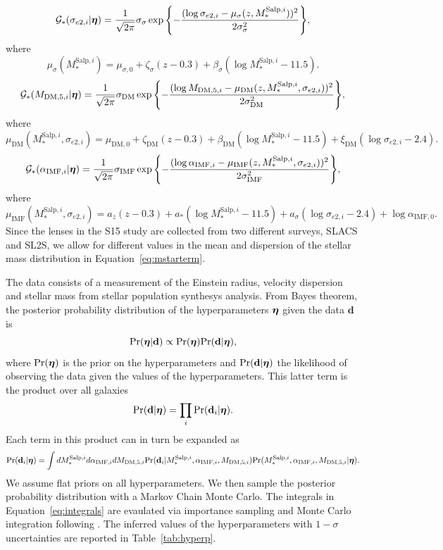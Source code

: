 \documentclass[usenatbib, letters]{mnras}
\newcommand{\boldsymbol}[1]{\mbox{\boldmath{${#1}$}}}
\def\pr{{\rm Pr}}
\def\hyperp{\boldsymbol{\eta}}
\def\msalpi{M_*^{\mathrm{Salp},i}}
\def\aimfi{\alpha_{\mathrm{IMF},i}}
\def\mdmi{M_{\mathrm{DM},5,i}}
\def\sigmaeei{\sigma_{e2,i}}
\def\datad{\mathbf{d}}
\def\datadi{\mathbf{d}_i}
\def\Tref#1{Table~\ref{#1}\xspace}
\def\Eref#1{Equation~\ref{#1}\xspace}
\begin{document}
\begin{equation}
\mathcal{G}_*(\sigmaeei|\hyperp) = \frac{1}{\sqrt{2\pi}}{\sigma_\sigma}\exp{\left\{-\frac{(\log{\sigmaeei} - \mu_\sigma(z, \msalpi))^2}{2\sigma_\sigma^2}\right\}},
\end{equation}
where
\begin{equation}
\mu_\sigma(\msalpi) = \mu_{\sigma,0} + \zeta_\sigma(z - 0.3) + \beta_\sigma(\log{\msalpi} - 11.5).
\end{equation}
%
\begin{equation}
\mathcal{G}_*(\mdmi|\hyperp) = \frac{1}{\sqrt{2\pi}}{\sigma_{\mathrm{DM}}}\exp{\left\{-\frac{(\log{\mdmi} - \mu_{\mathrm{DM}}(z, \msalpi, \sigmaeei))^2}{2\sigma_{\mathrm{DM}}^2}\right\}},
\end{equation}
where
\begin{equation}
\mu_{\mathrm{DM}}(\msalpi, \sigmaeei) = \mu_{\mathrm{DM},0} + \zeta_{\mathrm{DM}}(z - 0.3) + \beta_{\mathrm{DM}}(\log{\msalpi} - 11.5) + \xi_{\mathrm{DM}}(\log{\sigmaeei} - 2.4).
\end{equation}
%
\begin{equation}
\mathcal{G}_*(\aimfi|\hyperp) = \frac{1}{\sqrt{2\pi}}{\sigma_{\mathrm{IMF}}}\exp{\left\{-\frac{(\log{\aimfi} - \mu_{\mathrm{IMF}}(z, \msalpi, \sigmaeei))^2}{2\sigma_{\mathrm{IMF}}^2}\right\}},
\end{equation}
where
\begin{equation}
\mu_{\mathrm{IMF}}(\msalpi, \sigmaeei) = a_z(z - 0.3) + a_*(\log{\msalpi} - 11.5) + a_\sigma(\log{\sigmaeei} - 2.4) + \log{\alpha_{\mathrm{IMF},0}}.
\end{equation}
Since the lenses in the S15 study are collected from two different surveys, SLACS and SL2S, we allow for different values in the mean and dispersion of the stellar mass distribution in \Eref{eq:mstarterm}.

The data consists of a measurement of the Einstein radius, velocity dispersion and stellar mass from stellar population synthesys analysis.
From Bayes theorem, the posterior probability distribution of the hyperparameters $\hyperp$ given the data $\datad$ is
\begin{equation}
\pr(\hyperp|\datad) \propto \pr(\hyperp)\pr(\datad|\hyperp),
\end{equation}
where $\pr(\hyperp)$ is the prior on the hyperparameters and $\pr(\datad|\hyperp)$ the likelihood of observing the data given the values of the hyperparameters.
This latter term is the product over all galaxies
\begin{equation}
\pr(\datad|\hyperp) = \prod_i \pr(\datadi|\hyperp).
\end{equation}
Each term in this product can in turn be expanded as
\begin{equation}\label{eq:integrals}
\pr(\datadi|\hyperp) = \int d\msalpi d\aimfi d\mdmi \pr(\datadi|\msalpi,\aimfi,\mdmi) \pr(\msalpi,\aimfi,\mdmi|\hyperp).
\end{equation}
We assume flat priors on all hyperparameters.
We then sample the posterior probability distribution with a Markov Chain Monte Carlo. 
The integrals in \Eref{eq:integrals} are evaulated via importance sampling and Monte Carlo integration following \citet{Sch++15}.
The inferred values of the hyperparameters with $1-\sigma$ uncertainties are reported in \Tref{tab:hyperp}.
\end{document}
